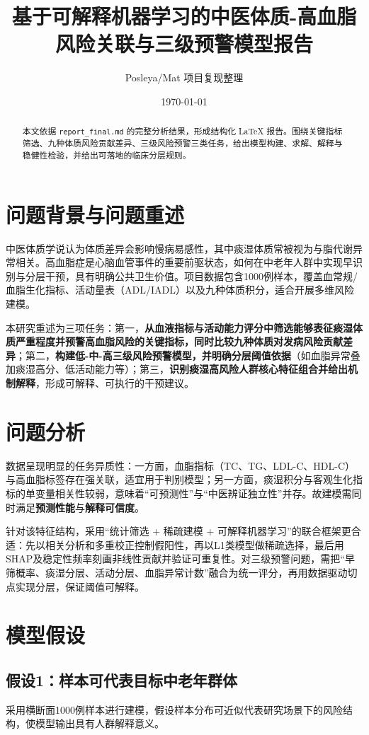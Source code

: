 \documentclass[12pt,a4paper]{ctexart}
\title{基于可解释机器学习的中医体质-高血脂风险关联与三级预警模型报告}
\author{Posleya/Mat 项目复现整理}
\date{\today}
\begin{document}
\maketitle

\begin{abstract}
本文依据 \texttt{report\_final.md} 的完整分析结果，形成结构化 \LaTeX{} 报告。围绕关键指标筛选、九种体质风险贡献差异、三级风险预警三类任务，给出模型构建、求解、解释与稳健性检验，并给出可落地的临床分层规则。
\end{abstract}

\section{问题背景与问题重述}
中医体质学说认为体质差异会影响慢病易感性，其中痰湿体质常被视为与脂代谢异常相关。高血脂症是心脑血管事件的重要前驱状态，如何在中老年人群中实现早识别与分层干预，具有明确公共卫生价值。项目数据包含1000例样本，覆盖血常规/血脂生化指标、活动量表（ADL/IADL）以及九种体质积分，适合开展多维风险建模。

本研究重述为三项任务：第一，\textbf{从血液指标与活动能力评分中筛选能够表征痰湿体质严重程度并预警高血脂风险的关键指标，同时比较九种体质对发病风险贡献差异}；第二，\textbf{构建低-中-高三级风险预警模型，并明确分层阈值依据}（如血脂异常叠加痰湿高分、低活动能力等）；第三，\textbf{识别痰湿高风险人群核心特征组合并给出机制解释}，形成可解释、可执行的干预建议。

\section{问题分析}
数据呈现明显的任务异质性：一方面，血脂指标（TC、TG、LDL-C、HDL-C）与高血脂标签存在强关联，适宜用于判别模型；另一方面，痰湿积分与客观生化指标的单变量相关性较弱，意味着“可预测性”与“中医辨证独立性”并存。故建模需同时满足\textbf{预测性能}与\textbf{解释可信度}。

针对该特征结构，采用“统计筛选 + 稀疏建模 + 可解释机器学习”的联合框架更合适：先以相关分析和多重校正控制假阳性，再以L1类模型做稀疏选择，最后用SHAP及稳定性频率刻画非线性贡献并验证可重复性。对三级预警问题，需把“早筛概率、痰湿分层、活动分层、血脂异常计数”融合为统一评分，再用数据驱动切点实现分层，保证阈值可解释。

\section{模型假设}
\subsection*{假设1：样本可代表目标中老年群体}
采用横断面1000例样本进行建模，假设样本分布可近似代表研究场景下的风险结构，使模型输出具有人群解释意义。
\end{document}
